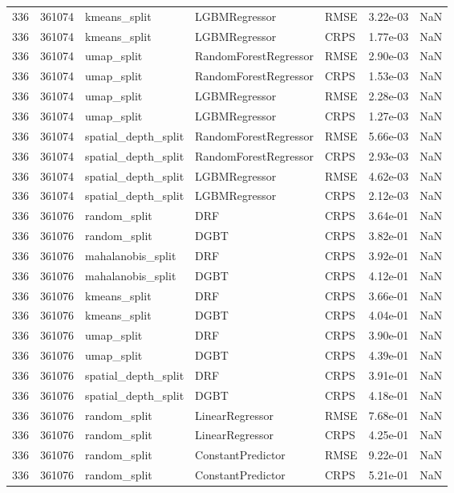 \begin{tabular}{rrlllrr}
336 & 361074 & kmeans\_split & LGBMRegressor & RMSE & 3.22e-03 & NaN \\
336 & 361074 & kmeans\_split & LGBMRegressor & CRPS & 1.77e-03 & NaN \\
336 & 361074 & umap\_split & RandomForestRegressor & RMSE & 2.90e-03 & NaN \\
336 & 361074 & umap\_split & RandomForestRegressor & CRPS & 1.53e-03 & NaN \\
336 & 361074 & umap\_split & LGBMRegressor & RMSE & 2.28e-03 & NaN \\
336 & 361074 & umap\_split & LGBMRegressor & CRPS & 1.27e-03 & NaN \\
336 & 361074 & spatial\_depth\_split & RandomForestRegressor & RMSE & 5.66e-03 & NaN \\
336 & 361074 & spatial\_depth\_split & RandomForestRegressor & CRPS & 2.93e-03 & NaN \\
336 & 361074 & spatial\_depth\_split & LGBMRegressor & RMSE & 4.62e-03 & NaN \\
336 & 361074 & spatial\_depth\_split & LGBMRegressor & CRPS & 2.12e-03 & NaN \\
336 & 361076 & random\_split & DRF & CRPS & 3.64e-01 & NaN \\
336 & 361076 & random\_split & DGBT & CRPS & 3.82e-01 & NaN \\
336 & 361076 & mahalanobis\_split & DRF & CRPS & 3.92e-01 & NaN \\
336 & 361076 & mahalanobis\_split & DGBT & CRPS & 4.12e-01 & NaN \\
336 & 361076 & kmeans\_split & DRF & CRPS & 3.66e-01 & NaN \\
336 & 361076 & kmeans\_split & DGBT & CRPS & 4.04e-01 & NaN \\
336 & 361076 & umap\_split & DRF & CRPS & 3.90e-01 & NaN \\
336 & 361076 & umap\_split & DGBT & CRPS & 4.39e-01 & NaN \\
336 & 361076 & spatial\_depth\_split & DRF & CRPS & 3.91e-01 & NaN \\
336 & 361076 & spatial\_depth\_split & DGBT & CRPS & 4.18e-01 & NaN \\
336 & 361076 & random\_split & LinearRegressor & RMSE & 7.68e-01 & NaN \\
336 & 361076 & random\_split & LinearRegressor & CRPS & 4.25e-01 & NaN \\
336 & 361076 & random\_split & ConstantPredictor & RMSE & 9.22e-01 & NaN \\
336 & 361076 & random\_split & ConstantPredictor & CRPS & 5.21e-01 & NaN \\

\end{tabular}
